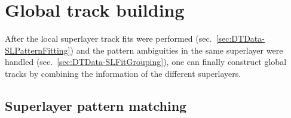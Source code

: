 \FloatBarrier
\section{Global track building}
\label{sec:DTData-GlobalTrackBuilding}
After the local superlayer track fits were performed (sec.\ \ref{sec:DTData-SLPatternFitting}) and the pattern ambiguities in the same superlayer were handled (sec.\ \ref{sec:DTData-SLFitGrouping}), one can finally construct global tracks by combining the information of the different superlayers.

\subsection{Superlayer pattern matching}
\label{sec:DTData-GlobalTrackBuilding-SLPatternMatching}
